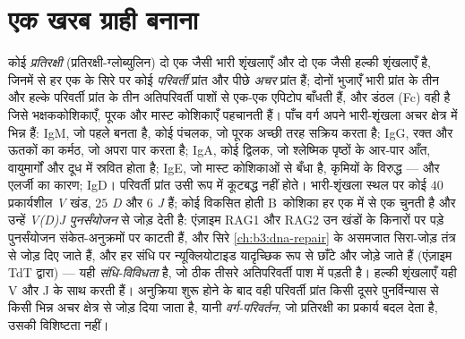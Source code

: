 \section{एक खरब ग्राही बनाना}

\begin{definition}[प्रतिरक्षी की संरचना और V(D)J पुनर्संयोजन]\label{def:b3:adaptive-immunity:antibody}
कोई \emph{प्रतिरक्षी} (प्रतिरक्षी-ग्लोब्युलिन) दो एक जैसी भारी
शृंखलाएँ और दो एक जैसी हल्की शृंखलाएँ है, जिनमें से हर एक के सिरे पर
कोई \emph{परिवर्ती} प्रांत और पीछे \emph{अचर} प्रांत हैं; दोनों भुजाएँ
भारी प्रांत के तीन और हल्के परिवर्ती प्रांत के तीन अतिपरिवर्ती पाशों
से एक-एक एपिटोप बाँधती हैं, और डंठल (Fc) वही है जिसे भक्षककोशिकाएँ,
पूरक और मास्ट कोशिकाएँ पहचानती हैं। पाँच वर्ग अपने भारी-शृंखला अचर
क्षेत्र में भिन्न हैं: IgM, जो पहले बनता है, कोई पंचलक, जो पूरक अच्छी
तरह सक्रिय करता है; IgG, रक्त और ऊतकों का कर्मठ, जो अपरा पार करता है;
IgA, कोई द्विलक, जो श्लेष्मिक पृष्ठों के आर-पार आँत, वायुमार्गों और
दूध में स्रवित होता है; IgE, जो मास्ट कोशिकाओं से बँधा है, कृमियों के
विरुद्ध --- और एलर्जी का कारण; IgD। परिवर्ती प्रांत उसी रूप में
कूटबद्ध नहीं होते। भारी-शृंखला स्थल पर कोई $40$ प्रकार्यशील
\emph{V} खंड, $25$ \emph{D} और $6$ \emph{J} हैं; कोई विकसित होती
B~कोशिका हर एक में से एक चुनती है और उन्हें \emph{V(D)J पुनर्संयोजन}
से जोड़ देती है: एंज़ाइम RAG1 और RAG2 उन खंडों के किनारों पर पड़े
पुनर्संयोजन संकेत-अनुक्रमों पर काटती हैं, और सिरे
\cref{ch:b3:dna-repair} के असमजात सिरा-जोड़ तंत्र से जोड़ दिए जाते हैं,
और हर संधि पर न्यूक्लियोटाइड यादृच्छिक रूप से छाँटे और जोड़े जाते हैं
(एंज़ाइम TdT द्वारा) --- यही \emph{संधि-विविधता} है, जो ठीक तीसरे
अतिपरिवर्ती पाश में पड़ती है। हल्की शृंखलाएँ यही V और J के साथ करती
हैं। अनुक्रिया शुरू होने के बाद वही परिवर्ती प्रांत किसी दूसरे
पुनर्विन्यास से किसी भिन्न अचर क्षेत्र से जोड़ दिया जाता है, यानी
\emph{वर्ग-परिवर्तन}, जो प्रतिरक्षी का प्रकार्य बदल देता है, उसकी
विशिष्टता नहीं।
\end{definition}

